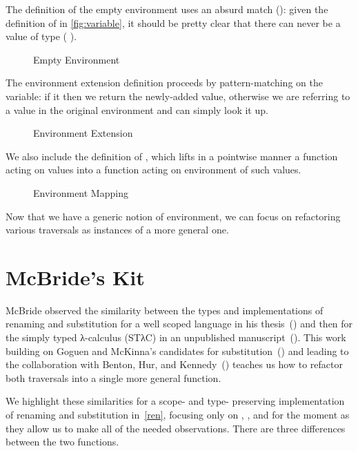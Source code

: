 \label{fig:envcombinators}

The definition of the empty environment uses an absurd match (\AS{()}): given
the definition of  in \cref{fig:variable}, it should be pretty clear
that there can never be a value of type ({  \AIC{[]}}).

\begin{figure}[h]
\caption{Empty Environment\label{fig:emptyenv}}
\end{figure}

The environment extension definition proceeds by pattern-matching on the
variable: if it  then we return the newly-added value, otherwise we are
referring to a value in the original environment and can simply look it up.

\begin{figure}[h]
\caption{Environment Extension\label{fig:envextend}}
\end{figure}

We also include the definition of \AF{\_<\$>\_}, which lifts in a
pointwise manner a function acting on values into a function acting
on environment of such values.

\begin{figure}[h]
\caption{Environment Mapping}\label{fig:baseenv}
\end{figure}

Now that we have a generic notion of environment, we can focus on
refactoring various traversals as instances of a more general one.

\section{McBride's Kit}

McBride observed the similarity between the types and implementations of renaming
and substitution for a well scoped language in his thesis~(\citeyear{mcbride1999})
and then for the simply typed λ-calculus (STλC) in an unpublished
manuscript~(\citeyear{mcbride2005type}). This work building on Goguen and McKinna's
candidates for substitution~(\citeyear{goguen1997candidates}) and leading to the
collaboration with Benton, Hur, and Kennedy~(\citeyear{benton2012strongly}) teaches
us how to refactor both traversals into a single more general function.

We highlight these similarities for a scope- and type- preserving
implementation of renaming and substitution in~\cref{ren}, focusing
only on , , and  for the moment as
they allow us to make all of the needed observations.
%
There are three differences between the two functions.

